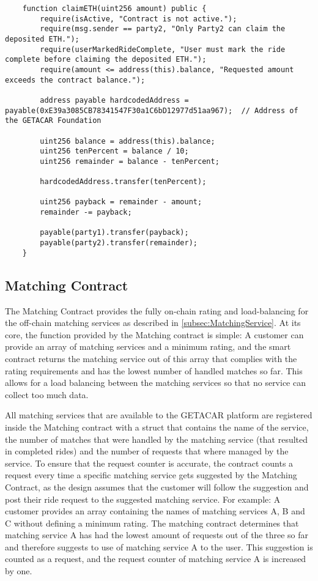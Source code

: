 \lstset{
  basicstyle=\footnotesize\ttfamily,
  breaklines=true,
  numbers=left,
  firstnumber=232
}
\begin{lstlisting}
    function claimETH(uint256 amount) public {
        require(isActive, "Contract is not active.");
        require(msg.sender == party2, "Only Party2 can claim the deposited ETH.");
        require(userMarkedRideComplete, "User must mark the ride complete before claiming the deposited ETH.");
        require(amount <= address(this).balance, "Requested amount exceeds the contract balance.");
        
        address payable hardcodedAddress = payable(0xE39a3085CB78341547F30a1C6bD12977d51aa967);  // Address of the GETACAR Foundation

        uint256 balance = address(this).balance;
        uint256 tenPercent = balance / 10;
        uint256 remainder = balance - tenPercent;

        hardcodedAddress.transfer(tenPercent);

        uint256 payback = remainder - amount;
        remainder -= payback;

        payable(party1).transfer(payback);
        payable(party2).transfer(remainder);
    }
\end{lstlisting}


\subsection{Matching Contract}

The Matching Contract provides the fully on-chain rating and load-balancing for the off-chain matching services as described in \ref{subsec:MatchingService}. At its core, the function provided by the Matching contract is simple: A customer can provide an array of matching services and a minimum rating, and the smart contract returns the matching service out of this array that complies with the rating requirements and has the lowest number of handled matches so far. This allows for a load balancing between the matching services so that no service can collect too much data.

All matching services that are available to the GETACAR platform are registered inside the Matching contract with a struct that contains the name of the service, the number of matches that were handled by the matching service (that resulted in completed rides) and the number of requests that where managed by the service. To ensure that the request counter is accurate, the contract counts a request every time a specific matching service gets suggested by the Matching Contract, as the design assumes that the customer will follow the suggestion and post their ride request to the suggested matching service. For example: A customer provides an array containing the names of matching services A, B and C without defining a minimum rating. The matching contract determines that matching service A has had the lowest amount of requests out of the three so far and therefore suggests to use of matching service A to the user. This suggestion is counted as a request, and the request counter of matching service A is increased by one.

